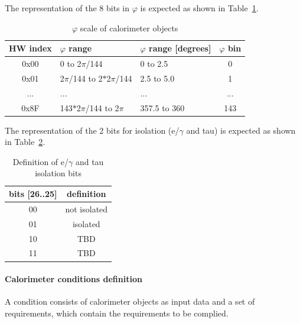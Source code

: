 The representation of the 8 bits in $\varphi$ is expected as shown in Table~\ref{tab:gtl:calo_phi_scale}.\\
 
\begin{table}[htdp]
\begin{center}
\begin{tabular}{|c|l|l|c|}\hline
HW index & $\varphi$ range & $\varphi$ range [degrees] & $\varphi$ bin\\\hline\hline
0x00 & 0 to 2$\pi$/144 & 0 to 2.5 & 0\\\hline
0x01 & 2$\pi$/144 to 2$*$2$\pi$/144 & 2.5 to 5.0 & 1\\\hline
... & ... & ... & ...\\\hline
0x8F & 143$*$2$\pi$/144 to 2$\pi$ & 357.5 to 360 & 143\\\hline
\end{tabular}
\end{center}
\caption{$\varphi$ scale of calorimeter objects}
\label{tab:gtl:calo_phi_scale}
\end{table}

The representation of the 2 bits for isolation (e/$\gamma$ and tau) is expected as shown in Table~\ref{tab:gtl:eg_tau_iso_bits}.\\

\begin{table}[ht]
\caption{Definition of e/$\gamma$ and tau isolation bits}
\vspace{5mm}
\centering
\begin{tabular}{|c|c|}\hline
bits [26..25] & definition \\\hline\hline
00 & not isolated \\
01 & isolated \\
10 & TBD \\
11 & TBD \\\hline
\end{tabular}
\label{tab:gtl:eg_tau_iso_bits}
\end{table}

\clearpage

\paragraph{Calorimeter conditions definition}\label{sec:gtl:calo_cond_def}

A condition consists of calorimeter objects as input data and a set of requirements, which contain the requirements to be complied.

